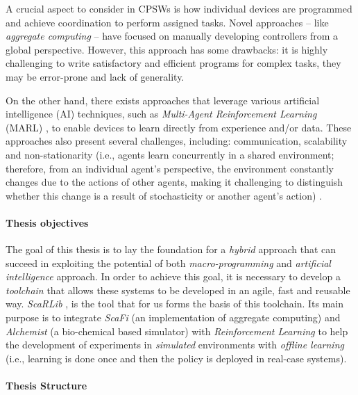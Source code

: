 \documentclass[12pt,a4paper,openright,twoside]{book}
\begin{document}
A crucial aspect to consider in CPSWs is how individual devices are programmed and achieve coordination to perform assigned tasks. 
    Novel approaches -- like \emph{aggregate computing} \cite{viroli2018field} -- have focused on manually developing
    controllers from a global perspective. However, this approach has some drawbacks: it is highly challenging to write satisfactory 
    and efficient programs for complex tasks, they may be error-prone and lack of generality.

On the other hand, there exists approaches that leverage various artificial intelligence (AI) techniques, 
    such as \emph{Multi-Agent Reinforcement Learning} (MARL) \cite{busoniu2008comprehensive, marlsurvey},
    to enable devices to learn directly from experience and/or data. These approaches also present several challenges, including: 
    communication, scalability and non-stationarity 
    (i.e., agents learn concurrently in a shared environment; therefore, from an individual agent's perspective, the environment 
    constantly changes due to the actions of other agents, making it challenging to distinguish whether this change is a result of 
    stochasticity or another agent's action) \cite{hernandez2017survey}.

%
\paragraph{Thesis objectives}
The goal of this thesis is to lay the foundation for a \emph{hybrid} approach 
    that can succeed in exploiting the potential of both \emph{macro-programming} and \emph{artificial intelligence} approach.
    In order to achieve this goal, it is necessary to develop a \emph{toolchain} that allows these systems to be developed in an agile,
    fast and reusable way. 
    \emph{ScaRLib} \cite{scarlib}, is the tool that for us forms the basis of this toolchain.
    Its main purpose is to integrate \emph{ScaFi} \cite{casadei2022scafi} (an implementation of aggregate computing) 
    and \emph{Alchemist} \cite{pianini2013chemical} (a bio-chemical based simulator) with \emph{Reinforcement Learning} 
    to help the development of experiments in \emph{simulated} environments with \emph{offline learning}
    (i.e., learning is done once and then the policy is deployed in real-case systems).

%
\paragraph{Thesis Structure} 
\end{document}
